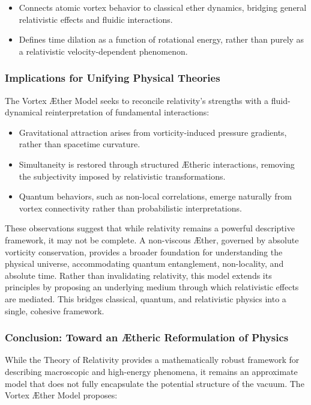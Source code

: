 \begin{itemize}
    \item Connects atomic vortex behavior to classical ether dynamics, bridging general relativistic effects and fluidic interactions.
    \item Defines time dilation as a function of rotational energy, rather than purely as a relativistic velocity-dependent phenomenon.
\end{itemize}
\subsubsection*{Implications for Unifying Physical Theories}
The Vortex \AE ther Model seeks to reconcile relativity’s strengths with a fluid-dynamical reinterpretation of fundamental interactions:

\begin{itemize}
    \item Gravitational attraction arises from vorticity-induced pressure gradients, rather than spacetime curvature.
    \item Simultaneity is restored through structured \AE theric interactions, removing the subjectivity imposed by relativistic transformations.
    \item Quantum behaviors, such as non-local correlations, emerge naturally from vortex connectivity rather than probabilistic interpretations.
\end{itemize}
These observations suggest that while relativity remains a powerful descriptive framework, it may not be complete. A non-viscous \AE ther, governed by absolute vorticity conservation, provides a broader foundation for understanding the physical universe, accommodating quantum entanglement, non-locality, and absolute time.
Rather than invalidating relativity, this model extends its principles by proposing an underlying medium through which relativistic effects are mediated.
This bridges classical, quantum, and relativistic physics into a single, cohesive framework.

\subsubsection*{Conclusion: Toward an \AE theric Reformulation of Physics}
While the Theory of Relativity provides a mathematically robust framework for describing macroscopic and high-energy phenomena, it remains an approximate model that does not fully encapsulate the potential structure of the vacuum.
The Vortex \AE ther Model proposes:


